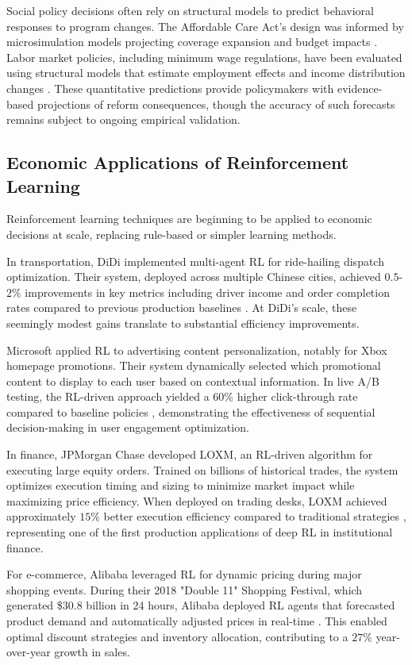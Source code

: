 Social policy decisions often rely on structural models to predict behavioral responses to program changes. The Affordable Care Act's design was informed by microsimulation models projecting coverage expansion and budget impacts \citep{ACA2011}. Labor market policies, including minimum wage regulations, have been evaluated using structural models that estimate employment effects and income distribution changes \citep{NPR2025}. These quantitative predictions provide policymakers with evidence-based projections of reform consequences, though the accuracy of such forecasts remains subject to ongoing empirical validation.

\subsection{Economic Applications of Reinforcement Learning}

Reinforcement learning techniques are beginning to be applied to economic decisions at scale, replacing rule-based or simpler learning methods. 

In transportation, DiDi implemented multi-agent RL for ride-hailing dispatch optimization. Their system, deployed across multiple Chinese cities, achieved $0.5$-$2\%$ improvements in key metrics including driver income and order completion rates compared to previous production baselines \citep{DiDi2019}. At DiDi's scale, these seemingly modest gains translate to substantial efficiency improvements.

Microsoft applied RL to advertising content personalization, notably for Xbox homepage promotions. Their system dynamically selected which promotional content to display to each user based on contextual information. In live A/B testing, the RL-driven approach yielded a $60\%$ higher click-through rate compared to baseline policies \citep{Microsoft2022}, demonstrating the effectiveness of sequential decision-making in user engagement optimization.

In finance, JPMorgan Chase developed LOXM, an RL-driven algorithm for executing large equity orders. Trained on billions of historical trades, the system optimizes execution timing and sizing to minimize market impact while maximizing price efficiency. When deployed on trading desks, LOXM achieved approximately $15\%$ better execution efficiency compared to traditional strategies \citep{JPMorgan2018}, representing one of the first production applications of deep RL in institutional finance.

For e-commerce, Alibaba leveraged RL for dynamic pricing during major shopping events. During their 2018 "Double 11" Shopping Festival, which generated \$30.8 billion in 24 hours, Alibaba deployed RL agents that forecasted product demand and automatically adjusted prices in real-time \citep{Alibaba2019}. This enabled optimal discount strategies and inventory allocation, contributing to a $27\%$ year-over-year growth in sales.

